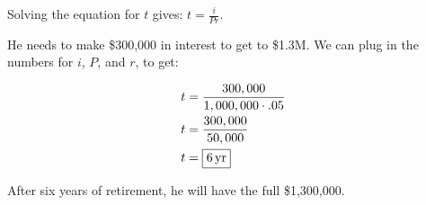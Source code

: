 \documentclass[letterpaper, landscape]{exam}
\begin{document}
\begin{questions}
\begin{parts}
          \begin{solution}
            Solving the equation for $t$ gives: $t = \frac{i}{P r}$.  
            
            He needs to make \$300,000 in interest to get to
            \$1.3M.  We can plug in the numbers for $i$, $P$, and $r$, to get:

              \begin{align*}
                t & = \frac{300,000}{1,000,000 \cdot .05}   \\
                t & = \frac{300,000}{50,000}   \\
                t & = \boxed{ \unit[6]{yr} } \\
              \end{align*}

              After six years of retirement, he will have the full \$1,300,000.

          \end{solution}

      \end{parts}





\end{questions}
\end{document}
